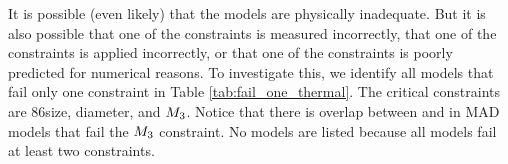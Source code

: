 It is possible (even likely) that the models are physically inadequate.  But it is also possible that one of the constraints is measured incorrectly, that one of the constraints is applied incorrectly, or that one of the constraints is poorly predicted for numerical reasons.  To investigate this, we identify all models that fail only one constraint in Table \ref{tab:fail_one_thermal}.  The critical constraints are 86\GHz size, \mring diameter, and $M_{3}$.  Notice that there is overlap between \kharma and \bhac in MAD models that fail the $M_{3}$ constraint.  No \hamr models are listed because all \hamr models fail at least two constraints.    






